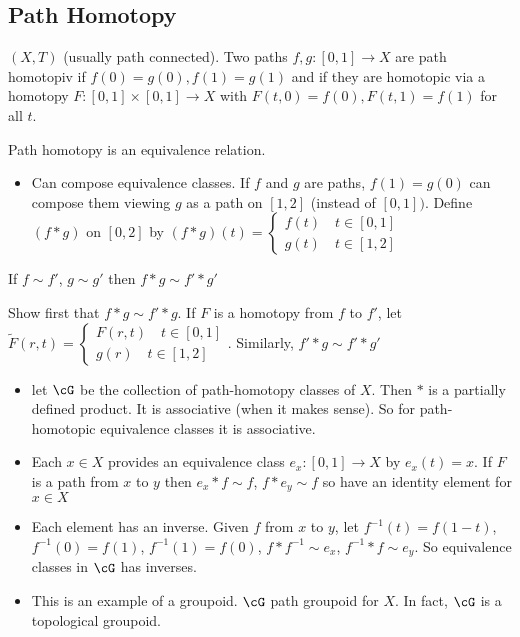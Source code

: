 
\subsection{Path Homotopy}

\begin{definition}
    $(X,T)$ (usually path connected). Two paths $f,g:[0,1] \to X$ are path homotopiv if $f(0)=g(0), f(1)=g(1)$ and if they are homotopic via a homotopy $F: [0,1] \times [0,1] \to X$ with $F(t,0) = f(0), F(t,1)=f(1)$ for all $t$. 
\end{definition}

\noindent
Path homotopy is an equivalence relation. 
\begin{itemize}
    \item Can compose equivalence classes. If $f$ and $g$ are paths, $f(1)=g(0)$ can compose them viewing $g$ as a path on $[1,2]$ (instead of $[0,1])$. Define $(f*g)$ on $[0,2]$ by $(f*g)(t) = \begin{cases} f(t) \quad t \in [0,1] \\ g(t) \quad t \in [1,2]\end{cases}$ 
\end{itemize}

\begin{proposition}
    If $f \sim f'$, $g \sim g'$ then $f*g \sim f' *g'$
\end{proposition}

\begin{pf}
    Show first that $f *g \sim f' *g$. If $F$ is a homotopy from $f$ to $f'$, let $\tilde{F}(r,t) = \begin{cases}
        F(r,t) \quad t \in [0,1] \\ g(r) \quad t \in [1,2] \end{cases}$. Similarly, $f' *g \sim f' *g'$ 
\end{pf}

\begin{itemize}
    \item let $\cG$ be the collection of path-homotopy classes of $X$. Then $*$ is a partially defined product. It is associative (when it makes sense). So for path-homotopic equivalence classes it is associative. 
    \item Each $x \in X$ provides an equivalence class $e_x: [0,1] \to X$ by $e_x(t)=x$. If $F$ is a path from $x$ to $y$ then $e_x *f \sim f$, $f*e_y \sim f$ so have an identity element for $x \in X$ 
    \item Each element has an inverse. Given $f$ from $x$ to $y$, let $f^{-1}(t) = f(1-t)$, $f^{-1}(0)=f(1)$, $f^{-1}(1)=f(0)$, $f * f^{-1} \sim e_x$, $f^{-1}*f \sim e_y$. So equivalence classes in $\cG$ has inverses. 
    \item This is an example of a groupoid. $\cG$ path groupoid for $X$. In fact, $\cG$ is a topological groupoid. 
\end{itemize}

